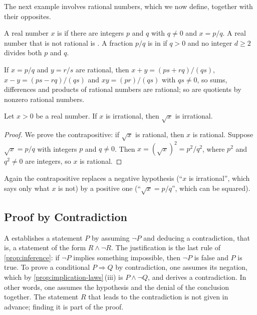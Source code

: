The next example involves rational numbers, which we now define, together with their opposites.

\begin{definition}
\label{def:rational}
A real number $x$ is  if there are integers $p$ and $q$ with $q\ne0$ and $x=p/q$. A real number that is not rational is . A fraction $p/q$ is in  if $q>0$ and no integer $d\ge2$ divides both $p$ and $q$.
\end{definition}

If $x=p/q$ and $y=r/s$ are rational, then $x+y=(ps+rq)/(qs)$, $x-y=(ps-rq)/(qs)$ and $xy=(pr)/(qs)$ with $qs\ne0$, so sums, differences and products of rational numbers are rational; so are quotients by nonzero rational numbers.

\begin{proposition}
\label{prop:sqrt-irrational}
Let $x>0$ be a real number. If $x$ is irrational, then $\sqrt x$ is irrational.
\end{proposition}

\begin{proof}
We prove the contrapositive: if $\sqrt x$ is rational, then $x$ is rational. Suppose $\sqrt x=p/q$ with integers $p$ and $q\ne0$. Then $x=(\sqrt x)^2=p^2/q^2$, where $p^2$ and $q^2\ne0$ are integers, so $x$ is rational.
\end{proof}

Again the contrapositive replaces a negative hypothesis (``$x$ is irrational'', which says only what $x$ is not) by a positive one (``$\sqrt x=p/q$'', which can be squared).

\subsection{Proof by Contradiction}

A  establishes a statement $P$ by assuming $\neg P$ and deducing a contradiction, that is, a statement of the form $R\wedge\neg R$. The justification is the last rule of \cref{prop:inference}: if $\neg P$ implies something impossible, then $\neg P$ is false and $P$ is true. To prove a conditional $P\Rightarrow Q$ by contradiction, one assumes its negation, which by \cref{prop:implication-laws}\,(iii) is $P\wedge\neg Q$, and derives a contradiction. In other words, one assumes the hypothesis and the denial of the conclusion together. The statement $R$ that leads to the contradiction is not given in advance; finding it is part of the proof.

